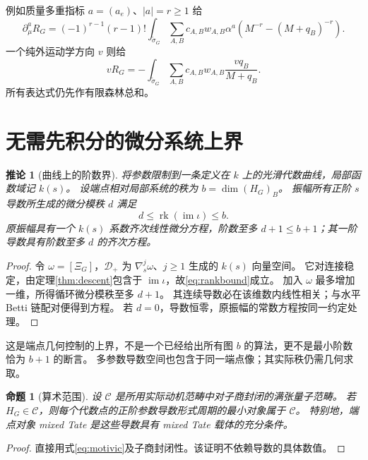 \documentclass[11pt,a4paper]{ctexart}
\theoremstyle{cnplain}
\newtheorem{proposition}[theorem]{命题}
\newtheorem{corollary}[theorem]{推论}
\theoremstyle{remark}\newtheorem{remark}[theorem]{注}
\newcommand{\im}{\operatorname{im}}
\newcommand{\rk}{\operatorname{rk}}
\begin{document}
例如质量多重指标 $a=(a_e)$、$|a|=r\geq1$ 给
\begin{equation}\label{eq:massderivative}
 \partial_\mu^a R_G
 =(-1)^{r-1}(r-1)!\int_{\widetilde\sigma_G}
   \sum_{A,B}c_{A,B}w_{A,B}\alpha^a
       \left(M^{-r}-(M+q_B)^{-r}\right).
\end{equation}
一个纯外运动学方向 $v$ 则给
\begin{equation}\label{eq:kinematic}
 vR_G=-\int_{\widetilde\sigma_G}
             \sum_{A,B}c_{A,B}w_{A,B}\frac{vq_B}{M+q_B}.
\end{equation}
所有表达式仍先作有限森林总和。

\section{无需先积分的微分系统上界}
\begin{corollary}[曲线上的阶数界]\label{cor:ode}
将参数限制到一条定义在 $k$ 上的光滑代数曲线，局部函数域记 $k(s)$。
设端点相对局部系统的秩为 $b=\dim(H_G)_B$。
振幅所有正阶 $s$ 导数所生成的微分模秩 $d$ 满足
\begin{equation}\label{eq:rankbound}
 d\leq\rk(\im\iota)\leq b.
\end{equation}
原振幅具有一个 $k(s)$ 系数齐次线性微分方程，阶数至多 $d+1\leq b+1$；其一阶导数具有阶数至多 $d$ 的齐次方程。
\end{corollary}
\begin{proof}
令 $\omega=[\Xi_G]$，$\mathcal D_+$ 为 $\nabla_s^j\omega$、$j\geq1$ 生成的 $k(s)$ 向量空间。
它对连接稳定，由定理\ref{thm:descent}包含于 $\im\iota$，故\eqref{eq:rankbound}成立。
加入 $\omega$ 最多增加一维，所得循环微分模秩至多 $d+1$。
其连续导数必在该维数内线性相关；与水平 Betti 链配对便得到方程。
若 $d=0$，导数恒零，原振幅的常数方程按同一约定处理。
\end{proof}

这是端点几何控制的上界，不是一个已经给出所有图 $b$ 的算法，更不是最小阶数恰为 $b+1$ 的断言。
多参数导数空间也包含于同一端点像；其实际秩仍需几何求取。

\begin{proposition}[算术范围]\label{prop:arithmetic}
设 $\mathcal C$ 是所用实际动机范畴中对子商封闭的满张量子范畴。
若 $H_G\in\mathcal C$，则每个代数点的正阶参数导数形式周期的最小对象属于 $\mathcal C$。
特别地，端点对象 mixed Tate 是这些导数具有 mixed Tate 载体的充分条件。
\end{proposition}
\begin{proof}
直接用式\eqref{eq:motivic}及子商封闭性。该证明不依赖导数的具体数值。
\end{proof}
\end{document}
